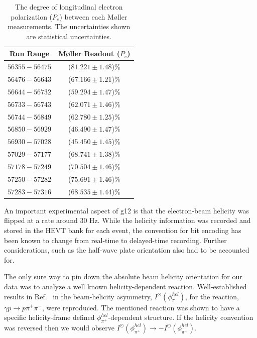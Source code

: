 \begin{table}
\begin{center}

\caption{\label{tab:pol:moller} The degree of longitudinal electron polarization ($P_{e}$) between each M{\o}ller measurements. The uncertainties shown are statistical uncertainties.}

\begin{tabular}{|c|c|}
\hline
Run Range & M{\o}ller Readout ($P_{e}$) \\
\hline 
$56355 - 56475$ & ($81.221 \pm 1.48$)\% \\
\hline 
$56476 - 56643$ & ($67.166 \pm 1.21$)\% \\
\hline 
$56644 - 56732$ & ($59.294 \pm 1.47$)\% \\
\hline 
$56733 - 56743$ & ($62.071 \pm 1.46$)\% \\
\hline 
$56744 - 56849$ & ($62.780 \pm 1.25$)\% \\
\hline 
$56850 - 56929$ & ($46.490 \pm 1.47$)\% \\
\hline 
$56930 - 57028$ & ($45.450 \pm 1.45$)\% \\
\hline 
$57029 - 57177$ & ($68.741 \pm 1.38$)\% \\
\hline 
$57178 - 57249$ & ($70.504 \pm 1.46$)\% \\
\hline 
$57250 - 57282$ & ($75.691 \pm 1.46$)\% \\
\hline 
$57283 - 57316$ & ($68.535 \pm 1.44$)\% \\
\hline

\end{tabular}

\end{center}

\end{table}


An important experimental aspect of g12 is that the electron-beam helicity was flipped at a rate around 30 Hz. While the helicity information was recorded and stored in the HEVT bank for each event, the convention for bit encoding has been known to change from real-time to delayed-time recording. Further considerations, such as the half-wave plate orientation also had to be accounted for.

The only sure way to pin down the absolute beam helicity orientation for our data was to analyze a well known helicity-dependent reaction. Well-established results in Ref.~\cite{Io} in the beam-helicity asymmetry, $I^\odot(\phi^{hel}_\pi)$, for the reaction, $\gamma p \to p \pi^+ \pi^-$, were reproduced.  The mentioned reaction was shown to have a specific helicity-frame defined $\phi^{hel}_{\pi^+}$-dependent structure.  If the helicity convention was reversed then we would observe $I^\odot(\phi^{hel}_{\pi^+}) \to -I^\odot(\phi^{hel}_{\pi^+})$.

